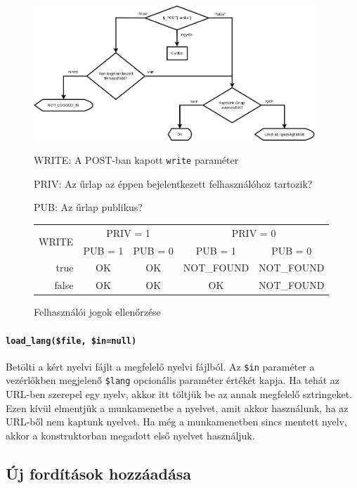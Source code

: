 \documentclass[12pt,a4paper,twoside]{article}
\newcommand{\desc}{
  \begin{description}{}{}
    \setlength\itemsep{0pt}
    \setlength\parskip{0pt}
    \setlength\topsep{0pt}
    \setlength\partopsep{0pt}
    \small}
\newcommand{\ed}{
  \end{description}
  \normalsize }
\begin{document}
\begin{figure}[h]
  \centering
  \includegraphics[width=400px]{rights.png}

  \desc\small
    \item[WRITE:] A POST-ban kapott \texttt{write} paraméter
    \item[PRIV:] Az űrlap az éppen bejelentkezett felhasználóhoz tartozik?
    \item[PUB:] Az űrlap publikus?
  \ed\normalsize

  \begin{tabular*}{\textwidth}{r|cc|cc}
    \multirow{2}{*}{WRITE} & \multicolumn{2}{c|}{PRIV = 1} & \multicolumn{2}{c}{PRIV = 0} \\
    & PUB = 1 & PUB = 0 & PUB = 1 & PUB = 0 \\
    \hline
    true  & OK & OK & NOT\_FOUND & NOT\_FOUND \\
    false & OK & OK & OK         & NOT\_FOUND \\
  \end{tabular*}

  \caption{Felhasználói jogok ellenőrzése}\label{fig:rights}
\end{figure}


\paragraph{\texttt{load\_lang(\$file, \$in=null)}}
Betölti a kért nyelvi fájlt a megfelelő nyelvi fájlból. Az \texttt{\$in}
paraméter a vezérlőkben megjelenő \texttt{\$lang} opcionális paraméter értékét
kapja. Ha tehát az URL-ben szerepel egy nyelv, akkor itt töltjük be az annak
megfelelő sztringeket. Ezen kívül elmentjük a munkamenetbe a nyelvet, amit akkor
használunk, ha az URL-ből nem kaptunk nyelvet. Ha még a munkamenetben sincs
mentett nyelv, akkor a konstruktorban megadott első nyelvet használjuk.


\subsection{Új fordítások hozzáadása}
\label{sec:manager-i18n}
\end{document}
